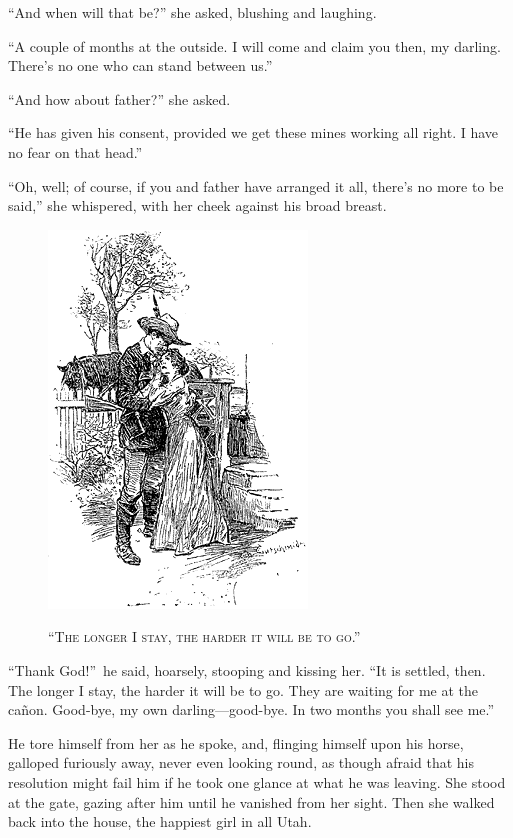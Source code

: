 \documentclass[12pt,english,oneside]{book}
\newcommand{\noun}[1]{\textsc{#1}}
\newcommand{\mdsh}[1]{\mbox{#1}\linebreak[1]}
\begin{document}
{}``And when will that be?'' she asked, blushing and laughing.

{}``A couple of months at the outside. I will come and claim you
then, my darling. There's no one who can stand between us.''

{}``And how about father?'' she asked.

{}``He has given his consent, provided we get these mines working
all right. I have no fear on that head.''

{}``Oh, well; of course, if you and father have arranged it all,
there's no more to be said,'' she whispered, with her cheek against
his broad breast.

%
\begin{figure}[htbp]
\noindent \begin{center}\includegraphics{images/study10-stud-17.png}\end{center}

\noindent \begin{center}\noun{{}``The longer I stay, the harder
it will be to go.''}\end{center}
\end{figure}
{}``Thank God!''\ he said, hoarsely, stooping and kissing her.
{}``It is settled, then. The longer I stay, the harder it will be
to go. They are waiting for me at the ca\~{n}on. Good-bye, my own darling\mdsh{---}good-bye.
In two months you shall see me.''

He tore himself from her as he spoke, and, flinging himself upon his
horse, galloped furiously away, never even looking round, as though
afraid that his resolution might fail him if he took one glance at
what he was leaving. She stood at the gate, gazing after him until
he vanished from her sight. Then she walked back into the house, the
happiest girl in all Utah.
\end{document}
